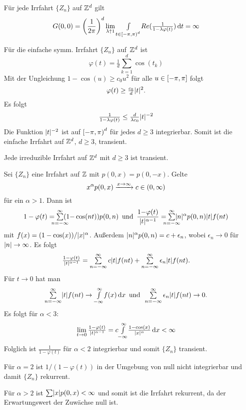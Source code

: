 \documentclass{cheat-sheet}
\begin{document}
\begin{satz}
  Für jede Irrfahrt $\{ Z_n \}$ auf $\mathbb{Z}^d$ gilt
  \[ G(0, 0) = \left( \frac{1}{2 \pi} \right)^d \lim_{\lambda \uparrow 1} {\textstyle \int\limits_{t \in \left[ -\pi, \pi \right)^d}^{}} Re(\tfrac{1}{1 - \lambda \varphi(t)}) \,\mathrm{d} t = \infty \]
\end{satz}

\begin{bsp}
  Für die einfache symm. Irrfahrt $\{ Z_n \}$ auf~$\mathbb{Z}^d$ ist
  \[
    \varphi(t) = \tfrac{1}{d} {\sum}_{k=1}^d \cos(t_k)
  \]
  Mit der Ungleichung $1 - \cos(u) \geq c_0 u^2$ für alle $u \in \left[ - \pi, \pi \right]$ folgt
  \[
    \varphi(t) \geq \tfrac{c_0}{d} \lvert t\rvert^2.
  \]
  Es folgt
  \[
    \tfrac{1}{1 - \lambda \varphi(t)} \leq \tfrac{d}{\lambda c_0} \lvert t\rvert^{-2}
  \]
  Die Funktion $\lvert t\rvert^{-2}$ ist auf $\left[ -\pi, \pi \right)^d$ für jedes $d \geq 3$ integrierbar.
  Somit ist die einfache Irrfahrt auf $\mathbb{Z}^d$, $d \geq 3$, transient.
\end{bsp}

\begin{satz}
  Jede irreduzible Irrfahrt auf $\mathbb{Z}^d$ mit $d \geq 3$ ist transient.
\end{satz}

\begin{bsp}
  Sei $\{ Z_n \}$ eine Irrfahrt auf $\mathbb{Z}$ mit $p(0, x) = p(0, -x)$.
  Gelte
  \[ x^\alpha p(0, x) \xrightarrow{x \to \infty} c \in \left( 0, \infty \right) \]
  für ein $\alpha > 1$.
  Dann ist
  \[
    1 - \varphi(t) = \sum_{\mathclap{n=-\infty}}^\infty (1{-}\cos(nt)) p(0, n)
    \enspace \text{und} \enspace
    \frac{1 {-} \varphi(t)}{\abs{t}^{\alpha - 1}} = \sum_{\mathclap{n=-\infty}}^\infty \abs{n}^\alpha p(0, n) \abs{t} f(n t)
  \]
  mit $f(x) = (1 - \cos(x))/\lvert x\rvert^\alpha$.
  Außerdem $\lvert n\rvert^\alpha p(0, n) = c + \epsilon_n$, wobei $\epsilon_n \to 0$ für $\lvert n\rvert \to \infty$.
  Es folgt
  \[
    \tfrac{1 - \varphi(t)}{\abs{t}^{\alpha - 1}} = \sum_{n=-\infty}^\infty c \abs{t} f(n t) + \sum_{n=-\infty}^\infty \epsilon_n \abs{t} f(n t).
  \]
  Für $t \to 0$ hat man
  \[
    \sum_{n=-\infty}^\infty \abs{t} f(n t) \to \Int{-\infty}{\infty}{f(x)}{x}
    \enspace \text{und} \enspace
    \sum_{n=-\infty}^\infty \epsilon_n \abs{t} f(n t) \to 0.
  \]
  Es folgt für $\alpha < 3$:
  \[ \lim_{t \to 0} \tfrac{1 - \varphi(t)}{\lvert t\rvert^{\alpha - 1}} = c {\textstyle \int\limits_{-\infty}^{\infty}} \tfrac{1 - \cos(x)}{\lvert x\rvert^\alpha} \,\mathrm{d} x < \infty \]
  Folglich ist $\tfrac{1}{1 - \varphi(t)}$ für $\alpha < 2$ integrierbar und somit $\{ Z_n \}$ transient.

  Für $\alpha = 2$ ist $1/(1 - \varphi(t))$ in der Umgebung von null nicht integrierbar und damit $\{ Z_n \}$ rekurrent.

  Für $\alpha > 2$ ist $\sum \abs{x} p(0, x) < \infty$ und somit ist die Irrfahrt rekurrent, da der Erwartungswert der Zuwächse null ist.
\end{bsp}
\end{document}
